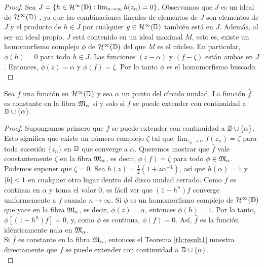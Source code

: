\begin{proof}
    Sea $J = \{h\in \mathcal{H}^{\infty}(\mathbb{D}) : \lim_{n \to \infty} h(z_n) = 0 \}$. Observamos que $J$ es un ideal de $\mathcal{H}^{\infty}(\mathbb{D})$ , ya que las combinaciones lineales de elementos de $J$ son elementos de $J$ y el producto de $h \in J$ por cualquier $g \in \mathcal{H}^{\infty}(\mathbb{D})$ también está en $J$. Además, al ser un ideal propio, $J$ está contenido en un ideal maximal $M$, esto es, existe un homomorfismo complejo $\phi$ de  $\mathcal{H}^{\infty}(\mathbb{D})$ del que $M$ es el núcleo. En particular, $\phi(h) = 0$ para todo $h \in J$. Las funciones $(z - \alpha)$ y $(f - \zeta)$ están ambas en $J$. Entonces, $\phi(z) = \alpha$ y $\phi(f) = \zeta$. Por lo tanto $\phi$ es el homomorfismo buscado. \\ %
\end{proof}

\begin{theorem}
    Sea $f$ una función en $\mathcal{H}^{\infty}(\mathbb{D})$ y sea $\alpha$ un punto del círculo unidad. La función $\widehat f$ es constante en la fibra $\mathfrak{M}_\alpha$ si y solo si $f$ se puede extender con continuidad a $\mathbb{D} \cup \{\alpha\}.$
\end{theorem}

\begin{proof}
    Supongamos primero que $f$ se puede extender con continuidad a $\mathbb{D} \cup \{ \alpha\}$. Esto significa que existe un número complejo $\zeta$ tal que $\lim_{z_n \to \alpha} f(z_n) = \zeta$ para toda sucesión $\{z_n\}$ en $\mathbb{D}$ que converge a $\alpha$. Queremos mostrar que $\widehat f$ vale constantemente $\zeta$ en la fibra $\mathfrak{M}_\alpha$, es decir, $\phi(f) = \zeta$ para todo $\phi \in \mathfrak{M}_\alpha$. \\

    Podemos suponer que $\zeta = 0$. Sea $h(z) = \frac{1}{2} (1 + z \alpha^{-1})$, así que $h(\alpha) = 1$ y $\left\lvert h\right\rvert < 1$ en cualquier otro lugar dentro del disco unidad cerrado. Como $f$ es continua en $\alpha$ y toma el valor $0$, es fácil ver que $(1 - h^n) f$ converge uniformemente a $f$ cuando $n \to \infty$. Si $\phi$ es un homomorfismo complejo de $\mathcal{H}^{\infty}(\mathbb{D})$ que yace en la fibra $\mathfrak{M}_\alpha$, es decir, $\phi (z) = \alpha$, entonces $\phi (h) = 1$. Por lo tanto, $\phi [(1 - h^n)f] = 0$, y, como $\phi$ es continua, $\phi (f) = 0$. Así, $\widehat f$ es la función idénticamente nula en $\mathfrak{M}_\alpha$. \\


    Si $\widehat f$ es constante en la fibra $\mathfrak{M}_\alpha$, entonces el Teorema \ref{th:result1} muestra directamente que $f$ se puede extender con continuidad a $\mathbb{D} \cup \{ \alpha \}$. \\
\end{proof}

